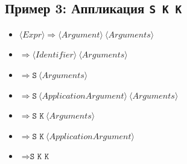 \documentclass{article}
\begin{document}
\subsection{Пример 3: Аппликация \texttt{S K K}}
\begin{itemize}
    \item $\langle Expr \rangle \Rightarrow \langle Argument \rangle \ \langle Arguments \rangle$
    \item $\Rightarrow \langle Identifier \rangle \ \langle Arguments \rangle$
    \item $\Rightarrow \texttt{S} \ \langle Arguments \rangle$
    \item $\Rightarrow \texttt{S} \ \langle ApplicationArgument \rangle \ \langle Arguments \rangle$
    \item $\Rightarrow \texttt{S K} \ \langle Arguments \rangle$
    \item $\Rightarrow \texttt{S K} \ \langle ApplicationArgument \rangle$
    \item $\Rightarrow \texttt{S K K}$
\end{itemize}
\end{document}
